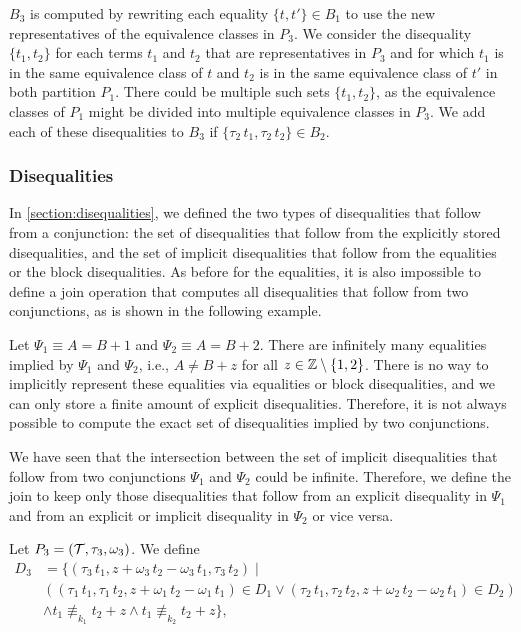 $B_3$ is computed by rewriting each equality $\{t, t'\} \in B_1$ to use the new representatives of the equivalence classes in $P_3$.
We consider the disequality $\{t_1, t_2\}$
for each terms $t_1$ and $t_2$ that are representatives in $P_3$ and for
which $t_1$ is in the same equivalence class of $t$ and $t_2$ is in the same equivalence class of $t'$ in both partition $P_1$.
There could be multiple such sets $\{t_1, t_2\}$,
as the equivalence classes of $P_1$ might be divided into multiple equivalence classes in $P_3$.
We add each of these disequalities to $B_3$ if $\{\tau_2\,t_1, \tau_2\,t_2\} \in B_2$.

\subsubsection{Disequalities}

In \cref{section:disequalities}, we defined the two types of disequalities that follow from a conjunction:
the set of disequalities that follow from the explicitly stored disequalities,
and the set of implicit disequalities that follow from the equalities or the block disequalities.
As before for the equalities, it is also impossible to define a join operation that computes all disequalities that follow from two conjunctions, as is shown in the following example.

\begin{example}
    Let $\Psi_1 \equiv A = B + 1$ and $\Psi_2 \equiv A = B + 2$. There are infinitely many equalities implied by $\Psi_1$ and $\Psi_2$, i.e., $A \neq B + z$ for all $z \in \mathbb{Z} \setminus \{1,2\}$.
    There is no way to implicitly represent these equalities via equalities or block disequalities, and we can only store a finite amount of explicit disequalities.
    Therefore, it is not always possible to compute the exact set of disequalities implied by two conjunctions.
\end{example}

We have seen that the intersection between the set of implicit disequalities that follow from two conjunctions $\Psi_1$ and $\Psi_2$ could be infinite.
Therefore, we define the join to keep only those disequalities that follow from an explicit disequality in $\Psi_1$ and from an explicit or implicit disequality in $\Psi_2$ or vice versa.

Let $P_3 = (\mathcal{T}, \tau_3, \omega_3)$.
We define
\[
    \begin{array}{ll}
        D_3 & = \{(\tau_3\,t_1,  z + \omega_3\,t_2 - \omega_3\,t_1, \tau_3\,t_2) \mid                                                                            \\
            & ((\tau_1\,t_1, \tau_1\,t_2, z + \omega_1\,t_2 - \omega_1\,t_1) \in D_1 \lor (\tau_2\,t_1, \tau_2\,t_2, z + \omega_2\,t_2 - \omega_2\,t_1) \in D_2) \\
            & \land t_1 \nequiv_{k_1} t_2 + z \land t_1 \nequiv_{k_2} t_2 + z\},
    \end{array}
\]

